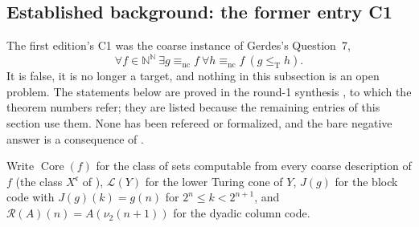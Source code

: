 \documentclass[11pt,a4paper]{article}
\newcommand{\N}{\mathbb N}
\newcommand{\R}{\mathcal R}
\newcommand{\Baire}{\N^{\N}}
\newcommand{\leT}{\leq_{\mathrm T}}
\newcommand{\Core}{\operatorname{Core}}\newcommand{\Low}{\mathcal L}
\theoremstyle{definition}\newtheorem{definition}[theorem]{Definition}
\theoremstyle{remark}\newtheorem{remark}[theorem]{Remark}
\begin{document}
\subsection{Established background: the former entry C1}\label{entry:C1}
The first edition's C1 was the coarse instance of Gerdes's Question~7,
\[
 \forall f\in\Baire\ \exists g\equiv_{\mathrm{nc}}f\
 \forall h\equiv_{\mathrm{nc}}f\ (g\leT h).
\]
It is false, it is no longer a target, and nothing in this subsection is an open problem. The statements below are proved in the round-1 synthesis \cite{Synthesis}, to which the theorem numbers refer; they are listed because the remaining entries of this section use them. None has been refereed or formalized, and the bare negative answer is a consequence of \cite[Theorems 4.2 and 4.3]{HJKS}.

Write $\Core(f)$ for the class of sets computable from every coarse description of $f$ (the class $X^{\mathfrak c}$ of \cite{HJKS}), $\Low(Y)$ for the lower Turing cone of $Y$, $J(g)$ for the block code with $J(g)(k)=g(n)$ for $2^n\le k<2^{n+1}$, and $\R(A)(n)=A(\nu_2(n+1))$ for the dyadic column code.
\end{document}

